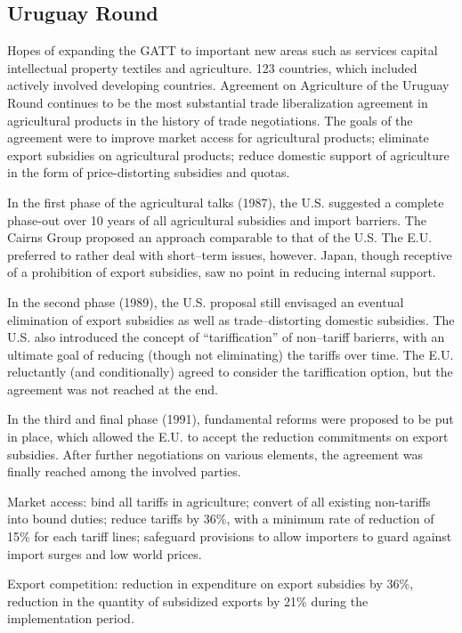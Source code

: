 \documentclass[]{book}
\begin{document}
\subsection{Uruguay Round}\label{uruguay-round}

Hopes of expanding the GATT to important new areas such as services
capital intellectual property textiles and agriculture. 123 countries,
which included actively involved developing countries. Agreement on
Agriculture of the Uruguay Round continues to be the most substantial
trade liberalization agreement in agricultural products in the history
of trade negotiations. The goals of the agreement were to improve market
access for agricultural products; eliminate export subsidies on
agricultural products; reduce domestic support of agriculture in the
form of price-distorting subsidies and quotas.

In the first phase of the agricultural talks (1987), the U.S. suggested
a complete phase-out over 10 years of all agricultural subsidies and
import barriers. The Cairns Group proposed an approach comparable to
that of the U.S. The E.U. preferred to rather deal with short--term
issues, however. Japan, though receptive of a prohibition of export
subsidies, saw no point in reducing internal support.

In the second phase (1989), the U.S. proposal still envisaged an
eventual elimination of export subsidies as well as trade--distorting
domestic subsidies. The U.S. also introduced the concept of
``tariffication'' of non--tariff barierrs, with an ultimate goal of
reducing (though not eliminating) the tariffs over time. The E.U.
reluctantly (and conditionally) agreed to consider the tariffication
option, but the agreement was not reached at the end.

In the third and final phase (1991), fundamental reforms were proposed
to be put in place, which allowed the E.U. to accept the reduction
commitments on export subsidies. After further negotiations on various
elements, the agreement was finally reached among the involved parties.

Market access: bind all tariffs in agriculture; convert of all existing
non-tariffs into bound duties; reduce tariffs by 36\%, with a minimum
rate of reduction of 15\% for each tariff lines; safeguard provisions to
allow importers to guard against import surges and low world prices.

Export competition: reduction in expenditure on export subsidies by
36\%, reduction in the quantity of subsidized exports by 21\% during the
implementation period.
\end{document}
